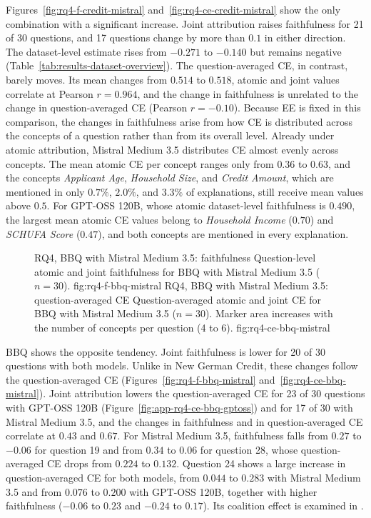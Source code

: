 Figures~\ref{fig:rq4-f-credit-mistral} and~\ref{fig:rq4-ce-credit-mistral} show the only combination with a significant increase. Joint attribution raises faithfulness for 21 of 30 questions, and 17 questions change by more than $0.1$ in either direction. The dataset-level estimate rises from $-0.271$ to $-0.140$ but remains negative (Table~\ref{tab:results-dataset-overview}). The question-averaged CE, in contrast, barely moves. Its mean changes from $0.514$ to $0.518$, atomic and joint values correlate at Pearson $r=0.964$, and the change in faithfulness is unrelated to the change in question-averaged CE (Pearson $r=-0.10$). Because EE is fixed in this comparison, the changes in faithfulness arise from how CE is distributed across the concepts of a question rather than from its overall level. Already under atomic attribution, Mistral Medium 3.5 distributes CE almost evenly across concepts. The mean atomic CE per concept ranges only from $0.36$ to $0.63$, and the concepts \textit{Applicant Age}, \textit{Household Size}, and \textit{Credit Amount}, which are mentioned in only $0.7\%$, $2.0\%$, and $3.3\%$ of explanations, still receive mean values above $0.5$. For GPT-OSS 120B, whose atomic dataset-level faithfulness is $0.490$, the largest mean atomic CE values belong to \textit{Household Income} ($0.70$) and \textit{SCHUFA Score} ($0.47$), and both concepts are mentioned in every explanation.

\begin{figure}[htb]
  \centering
    {RQ4, BBQ with Mistral Medium 3.5: faithfulness}%
    {Question-level atomic and joint faithfulness for BBQ with Mistral Medium 3.5 ($n=30$).}%
    {fig:rq4-f-bbq-mistral}%
  \hfill
    {RQ4, BBQ with Mistral Medium 3.5: question-averaged CE}%
    {Question-averaged atomic and joint CE for BBQ with Mistral Medium 3.5 ($n=30$). Marker area increases with the number of concepts per question (4 to 6).}%
    {fig:rq4-ce-bbq-mistral}%
\end{figure}

BBQ shows the opposite tendency. Joint faithfulness is lower for 20 of 30 questions with both models. Unlike in New German Credit, these changes follow the question-averaged CE (Figures~\ref{fig:rq4-f-bbq-mistral} and~\ref{fig:rq4-ce-bbq-mistral}). Joint attribution lowers the question-averaged CE for 23 of 30 questions with GPT-OSS 120B (Figure~\ref{fig:app-rq4-ce-bbq-gptoss}) and for 17 of 30 with Mistral Medium 3.5, and the changes in faithfulness and in question-averaged CE correlate at $0.43$ and $0.67$. For Mistral Medium 3.5, faithfulness falls from $0.27$ to $-0.06$ for question 19 and from $0.34$ to $0.06$ for question 28, whose question-averaged CE drops from $0.224$ to $0.132$. Question 24 shows a large increase in question-averaged CE for both models, from $0.044$ to $0.283$ with Mistral Medium 3.5 and from $0.076$ to $0.200$ with GPT-OSS 120B, together with higher faithfulness ($-0.06$ to $0.23$ and $-0.24$ to $0.17$). Its coalition effect is examined in .

